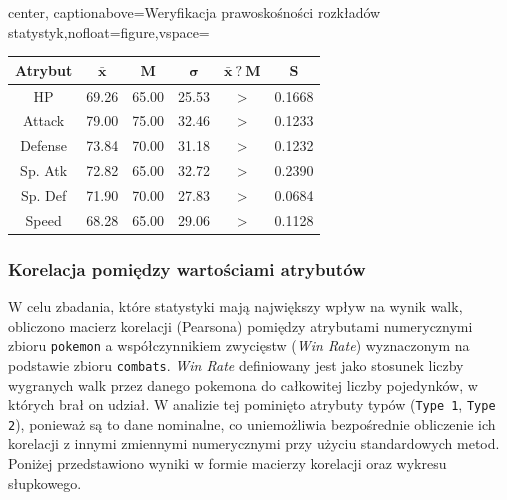 \documentclass[12pt, a4paper]{report}
\begin{document}
\begin{adjustbox}{center, captionabove={Weryfikacja prawoskośności rozkładów statystyk},nofloat=figure,vspace=\bigskipamount}
\begin{tabular}{|c|c|c|c|c|c|}
\hline
\textbf{Atrybut} & \(\mathbf{\bar x}\) & \(\mathbf{M}\) & \(\mathbf{\sigma}\) & \(\mathbf{\bar x\ ?\ M}\) & \(\mathbf{S}\) \\ \hline
HP               & 69.26            & 65.00            & 25.53                                                                     & \textgreater{}             & 0.1668                                                                        \\ \hline
Attack           & 79.00            & 75.00            & 32.46                                                                     & \textgreater{}             & 0.1233                                                                        \\ \hline
Defense          & 73.84            & 70.00            & 31.18                                                                     & \textgreater{}             & 0.1232                                                                        \\ \hline
Sp. Atk          & 72.82            & 65.00            & 32.72                                                                     & \textgreater{}             & 0.2390                                                                        \\ \hline
Sp. Def          & 71.90            & 70.00            & 27.83                                                                     & \textgreater{}             & 0.0684                                                                        \\ \hline
Speed            & 68.28            & 65.00            & 29.06                                                                     & \textgreater{}             & 0.1128                                                                        \\ \hline
\end{tabular}
\end{adjustbox}


\subsubsection{Korelacja pomiędzy wartościami atrybutów}

W celu zbadania, które statystyki mają największy wpływ na wynik walk, obliczono macierz korelacji (Pearsona) pomiędzy atrybutami numerycznymi zbioru \texttt{pokemon} a współczynnikiem zwycięstw (\textit{Win Rate}) wyznaczonym na podstawie zbioru \texttt{combats}. \textit{Win Rate} definiowany jest jako stosunek liczby wygranych walk przez danego pokemona do całkowitej liczby pojedynków, w których brał on udział. W analizie tej pominięto atrybuty typów (\texttt{Type 1}, \texttt{Type 2}), ponieważ są to dane nominalne, co uniemożliwia bezpośrednie obliczenie ich korelacji z innymi zmiennymi numerycznymi przy użyciu standardowych metod. Poniżej przedstawiono wyniki w formie macierzy korelacji oraz wykresu słupkowego.
\end{document}

